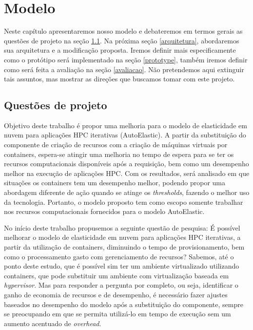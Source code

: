 \documentclass[twoside,english,brazilian]{UNISINOSartigo}
\begin{document}
\chapter{Modelo}
\label{model}

Neste capítulo apresentaremos nosso modelo e debateremos em termos gerais as questões de projeto na seção \ref{questao}. Na próxima seção \ref{arquitetura}, abordaremos sua arquitetura e a modificação proposta. Iremos definir mais especificamente como o protótipo será implementado na seção \ref{prototype}, também iremos definir como será feita a avaliação na seção \ref{avaliacao}. Não pretendemos aqui extinguir tais assuntos, mas mostrar as direções que buscamos tomar com este projeto.


\section{Questões de projeto}
\label{questao}

Objetivo deste trabalho é propor uma melhoria para o modelo de elasticidade em nuvem para aplicações HPC iterativas (AutoElastic). A partir da substituição do componente de criação de recursos com a criação de máquinas virtuais por containers, espera-se atingir uma melhoria no tempo de espera para se ter os recursos computacionais disponíveis após a requisição, bem como um desempenho melhor na execução de aplicações HPC. Com os resultados, será analisado em que situações os containers tem um desempenho melhor, podendo propor uma abordagem diferente de ação quando se atinge os \textit{thresholds}, fazendo o melhor uso da tecnologia. Portanto, o modelo proposto tem como escopo somente trabalhar nos recursos computacionais fornecidos para o modelo AutoElastic. 


No início deste trabalho propusemos a seguinte questão de pesquisa: É possível melhorar o modelo de elasticidade em nuvem para aplicações HPC iterativas, a partir da utilização de containers, diminuindo o tempo de provisionamento, bem como o processamento gasto com gerenciamento de recursos? Sabemos, até o ponto deste estudo, que é possível sim ter um ambiente virtualizado utilizando containers, que pode substituir um ambiente com virtualização baseada em \textit{hypervisor}. Mas para responder a pergunta por completo, ou seja, identificar o ganho de economia de recursos e de desempenho, é necessário fazer ajustes baseados no desempenho do modelo após a substituição do componente, sempre se preocupando em que se permita utilizá-lo em tempo de execução sem um aumento acentuado de \textit{overhead}. 
\end{document}

